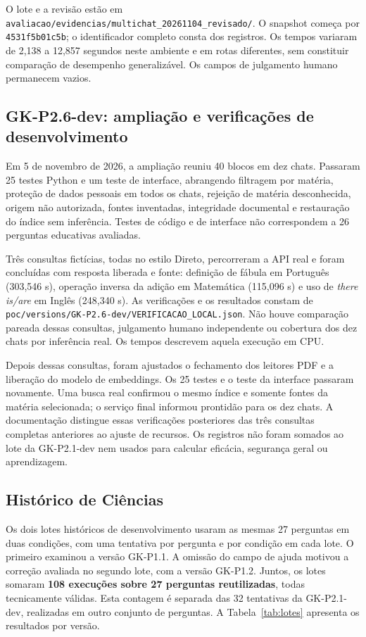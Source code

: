 O lote e a revisão estão em \nolinkurl{avaliacao/evidencias/multichat_20261104_revisado/}. O snapshot começa por \texttt{4531f5b01c5b}; o identificador completo consta dos registros. Os tempos variaram de 2,138 a 12,857 segundos neste ambiente e em rotas diferentes, sem constituir comparação de desempenho generalizável. Os campos de julgamento humano permanecem vazios.

\subsection{GK-P2.6-dev: ampliação e verificações de desenvolvimento}

Em 5 de novembro de 2026, a ampliação reuniu 40 blocos em dez chats. Passaram 25 testes Python e um teste de interface, abrangendo filtragem por matéria, proteção de dados pessoais em todos os chats, rejeição de matéria desconhecida, origem não autorizada, fontes inventadas, integridade documental e restauração do índice sem inferência. Testes de código e de interface não correspondem a 26 perguntas educativas avaliadas.

Três consultas fictícias, todas no estilo Direto, percorreram a API real e foram concluídas com resposta liberada e fonte: definição de fábula em Português (303,546 s), operação inversa da adição em Matemática (115,096 s) e uso de \textit{there is/are} em Inglês (248,340 s). As verificações e os resultados constam de \nolinkurl{poc/versions/GK-P2.6-dev/VERIFICACAO_LOCAL.json}. Não houve comparação pareada dessas consultas, julgamento humano independente ou cobertura dos dez chats por inferência real. Os tempos descrevem aquela execução em CPU.

Depois dessas consultas, foram ajustados o fechamento dos leitores PDF e a liberação do modelo de embeddings. Os 25 testes e o teste da interface passaram novamente. Uma busca real confirmou o mesmo índice e somente fontes da matéria selecionada; o serviço final informou prontidão para os dez chats. A documentação distingue essas verificações posteriores das três consultas completas anteriores ao ajuste de recursos. Os registros não foram somados ao lote da GK-P2.1-dev nem usados para calcular eficácia, segurança geral ou aprendizagem.

\subsection{Histórico de Ciências}

Os dois lotes históricos de desenvolvimento usaram as mesmas 27 perguntas em duas condições, com uma tentativa por pergunta e por condição em cada lote. O primeiro examinou a versão GK-P1.1. A omissão do campo de ajuda motivou a correção avaliada no segundo lote, com a versão GK-P1.2. Juntos, os lotes somaram \textbf{108 execuções sobre 27 perguntas reutilizadas}, todas tecnicamente válidas. Esta contagem é separada das 32 tentativas da GK-P2.1-dev, realizadas em outro conjunto de perguntas. A Tabela~\ref{tab:lotes} apresenta os resultados por versão.

